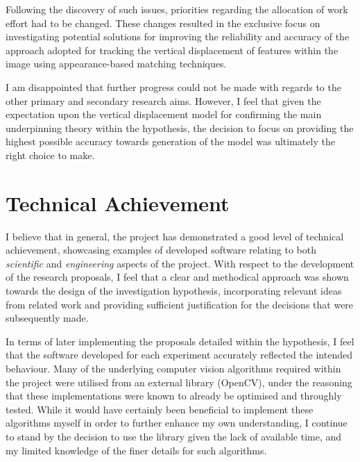 Following the discovery of such issues, priorities regarding the allocation of work effort had to be changed. These changes resulted in the exclusive focus on investigating potential solutions for improving the reliability and accuracy of the approach adopted for tracking the vertical displacement of features within the image using appearance-based matching techniques. 

I am disappointed that further progress could not be made with regards to the other primary and secondary research aims. However, I feel that given the expectation upon the vertical displacement model for confirming the main underpinning theory within the hypothesis, the decision to focus on providing the highest possible accuracy towards generation of the model was ultimately the right choice to make.


\section{Technical Achievement}


I believe that in general, the project has demonstrated a good level of technical achievement, showcasing examples of developed software relating to both \textit{scientific} and \textit{engineering} aspects of the project. With respect to the development of the research proposals, I feel that a clear and methodical approach was shown towards the design of the investigation hypothesis, incorporating relevant ideas from related work and providing sufficient justification for the decisions that were subsequently made.

In terms of later implementing the proposals detailed within the hypothesis, I feel that the software developed for each experiment accurately reflected the intended behaviour. Many of the underlying computer vision algorithms required within the project were utilised from an external library (OpenCV), under the reasoning that these implementations were known to already be optimised and throughly tested. While it would have certainly been beneficial to implement these algorithms myself in order to further enhance my own understanding, I continue to stand by the decision to use the library given the lack of available time, and my limited knowledge of the finer details for such algorithms.  

